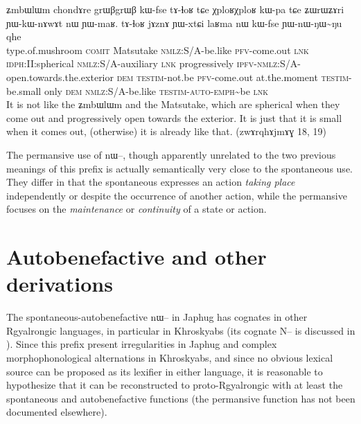 \documentclass[oldfontcommands,oneside,a4paper,11pt]{article}
\newcommand{\ipa}[1]{{\phon \mbox{#1}}} %
\begin{document}
\begin{exe}
 \ex \label{ex:YWnWNWNu}
 \gll
\ipa{ʑmbɯlɯm}	\ipa{chondɤre}  	\ipa{grɯβgrɯβ}  	\ipa{kɯ-fse}  	\ipa{tɤ-ɬoʁ}  	\ipa{tɕe}  	\ipa{χploʁχploʁ}  	\ipa{kɯ-pa}  
\ipa{tɕe}  	\ipa{ʑɯrɯʑɤri}  	\ipa{ɲɯ-kɯ-nɤwɤt}  	\ipa{nɯ}  	\ipa{ɲɯ-maʁ.}  
\ipa{tɤ-ɬoʁ}  	\ipa{jɤznɤ}  	\ipa{ɲɯ-xtɕi}  	\ipa{laʁma}  	\ipa{nɯ}  	\ipa{kɯ-fse}  	\ipa{ɲɯ-nɯ-ŋɯ\textasciitilde{}ŋu}  	\ipa{qhe}  	\\
type.of.mushroom \textsc{comit} Matsutake \textsc{nmlz}:S/A-be.like \textsc{pfv}-come.out \textsc{lnk} \textsc{idph:II:}spherical \textsc{nmlz}:S/A-auxiliary \textsc{lnk} progressively \textsc{ipfv}-\textsc{nmlz}:S/A-open.towards.the.exterior \textsc{dem} \textsc{testim}-not.be  \textsc{pfv}-come.out at.the.moment \textsc{testim}-be.small only \textsc{dem} \textsc{nmlz}:S/A-be.like \textsc{testim-auto}-\textsc{emph}\textasciitilde{}be \textsc{lnk} \\
\glt It is not like the \ipa{ʑmbɯlɯm} and the Matsutake, which are spherical when they come out and progressively open towards the exterior. It is just that it is small when it comes out, (otherwise) it is already like that.
 (\ipa{zwɤrqhɤjmɤɣ} 18, 19)
 \end{exe}


The permansive use of \ipa{nɯ--}, though apparently unrelated to the two previous meanings of this prefix is actually semantically very close to the spontaneous use. They differ in that the spontaneous expresses an action \textit{taking place} independently or despite the occurrence of another action, while the permansive focuses on the \textit{maintenance} or \textit{continuity} of a state or action.

\section{Autobenefactive and other derivations}

The spontaneous-autobenefactive \ipa{nɯ--} in Japhug has cognates in other Rgyalrongic languages, in particular in Khroskyabs (its cognate \ipa{N--} is discussed in \citealt[157-160]{lai13affixale}). Since this prefix present irregularities in Japhug and complex morphophonological alternations in Khroskyabs, and since no obvious lexical source can be proposed as its lexifier in either language, it is reasonable to hypothesize that it can be reconstructed to proto-Rgyalrongic with at least the spontaneous and autobenefactive functions (the permansive function has not been documented elsewhere).
\end{document}
